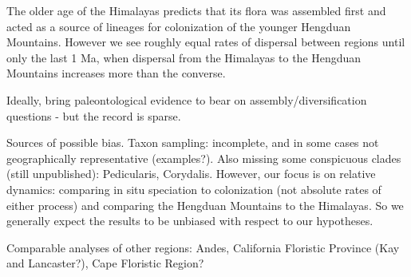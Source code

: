 The older age of the Himalayas predicts that its flora was assembled first and acted as a source of lineages for colonization of the younger Hengduan Mountains. However we see roughly equal rates of dispersal between regions until only the last 1 Ma, when dispersal from the Himalayas to the Hengduan Mountains increases more than the converse. 



Ideally, bring paleontological evidence to bear on assembly/diversification questions - but the record is sparse.

Sources of possible bias. Taxon sampling: incomplete, and in some cases not geographically representative (examples?). Also missing some conspicuous clades (still unpublished): Pedicularis, Corydalis. However, our focus is on relative dynamics: comparing in situ speciation to colonization (not absolute rates of either process) and comparing the Hengduan Mountains to the Himalayas. So we generally expect the results to be unbiased with respect to our hypotheses.

Comparable analyses of other regions: Andes, California Floristic Province (Kay and Lancaster?), Cape Floristic Region?
